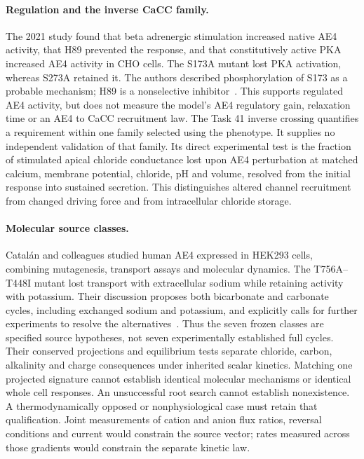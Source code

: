 \paragraph{Regulation and the inverse CaCC family.}
The 2021 study found that beta adrenergic stimulation increased native
AE4 activity, that H89 prevented the response, and that constitutively
active PKA increased AE4 activity in CHO cells. The S173A mutant lost
PKA activation, whereas S273A retained it. The authors described
phosphorylation of S173 as a probable mechanism; H89 is a nonselective
inhibitor~\cite{Pena2021}.
This supports regulated AE4 activity, but does not measure the model's
AE4 regulatory gain, relaxation time or an AE4 to CaCC recruitment law.
The Task 41 inverse crossing quantifies a requirement within one family
selected using the phenotype. It supplies no independent validation of
that family. Its direct experimental test is the fraction of stimulated
apical chloride conductance lost upon AE4 perturbation at matched
calcium, membrane potential, chloride, pH and volume, resolved from the
initial response into sustained secretion. This distinguishes altered
channel recruitment from changed driving force and from intracellular
chloride storage.

\paragraph{Molecular source classes.}
Catal\'an and colleagues studied human AE4 expressed in HEK293 cells,
combining mutagenesis, transport assays and molecular dynamics. The
T756A--T448I mutant lost transport with extracellular sodium while
retaining activity with potassium. Their discussion proposes both
bicarbonate and carbonate cycles, including exchanged sodium and
potassium, and explicitly calls for further experiments to resolve
the alternatives~\cite{Catalan2025}.
Thus the seven frozen classes are specified source hypotheses, not seven
experimentally established full cycles. Their conserved projections
and equilibrium tests separate chloride, carbon, alkalinity and charge
consequences under inherited scalar kinetics. Matching one projected
signature cannot establish identical molecular mechanisms or identical
whole cell responses. An unsuccessful root search cannot establish
nonexistence. A thermodynamically opposed or nonphysiological case must
retain that qualification. Joint measurements of cation and anion
flux ratios, reversal conditions and current would constrain the source
vector; rates measured across those gradients would constrain the
separate kinetic law.

